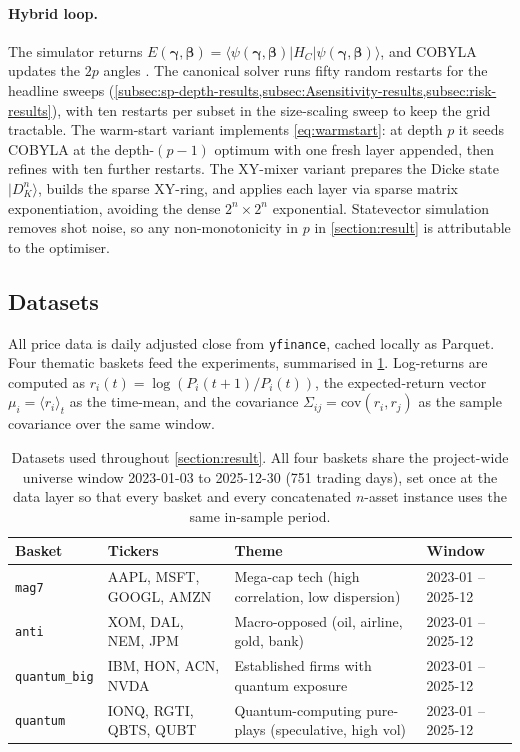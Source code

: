 \paragraph{Hybrid loop.} The simulator returns $E(\boldsymbol{\gamma},\boldsymbol{\beta}) = \langle\psi(\boldsymbol{\gamma},\boldsymbol{\beta})|H_C|\psi(\boldsymbol{\gamma},\boldsymbol{\beta})\rangle$, and COBYLA updates the $2p$ angles \parencite{zhou2018qaoa}. The canonical solver runs fifty random restarts for the headline sweeps (\cref{subsec:sp-depth-results,subsec:Asensitivity-results,subsec:risk-results}), with ten restarts per subset in the size-scaling sweep to keep the grid tractable. The warm-start variant implements \cref{eq:warmstart}: at depth $p$ it seeds COBYLA at the depth-$(p-1)$ optimum with one fresh layer appended, then refines with ten further restarts. The XY-mixer variant prepares the Dicke state $|D^n_K\rangle$, builds the sparse XY-ring, and applies each layer via sparse matrix exponentiation, avoiding the dense $2^n\times 2^n$ exponential. Statevector simulation removes shot noise, so any non-monotonicity in $p$ in \cref{section:result} is attributable to the optimiser.

\subsection{Datasets}\label{subsec:datasets}

All price data is daily adjusted close from \texttt{yfinance}, cached locally as Parquet. Four thematic baskets feed the experiments, summarised in \cref{tab:datasets}. Log-returns are computed as $r_i(t) = \log(P_i(t+1)/P_i(t))$, the expected-return vector $\mu_i = \langle r_i\rangle_t$ as the time-mean, and the covariance $\Sigma_{ij} = \mathrm{cov}(r_i, r_j)$ as the sample covariance over the same window.

\begin{table}[t]
  \centering
  \small
  \caption{Datasets used throughout \cref{section:result}. All four baskets share the project-wide universe window 2023-01-03 to 2025-12-30 (751 trading days), set once at the data layer so that every basket and every concatenated $n$-asset instance uses the same in-sample period.}
  \label{tab:datasets}
  \begin{tabular}{@{}llll@{}}
    \toprule
    Basket & Tickers & Theme & Window \\
    \midrule
    \texttt{mag7}         & AAPL, MSFT, GOOGL, AMZN & Mega-cap tech (high correlation, low dispersion)         & 2023-01 -- 2025-12 \\
    \texttt{anti}         & XOM, DAL, NEM, JPM      & Macro-opposed (oil, airline, gold, bank)                   & 2023-01 -- 2025-12 \\
    \texttt{quantum\_big} & IBM, HON, ACN, NVDA     & Established firms with quantum exposure                    & 2023-01 -- 2025-12 \\
    \texttt{quantum}      & IONQ, RGTI, QBTS, QUBT  & Quantum-computing pure-plays (speculative, high vol)       & 2023-01 -- 2025-12 \\
    \bottomrule
  \end{tabular}
\end{table}

